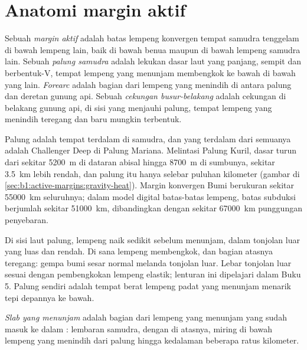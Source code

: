 \section{Anatomi margin aktif}\label{sec:b1:active-margins:anatomy}

\begin{definition}\label{def:b1:active-margins:active-margin}
Sebuah \emph{margin aktif} adalah batas lempeng konvergen tempat  samudra tenggelam di bawah lempeng lain, baik di bawah benua maupun di bawah lempeng samudra lain. Sebuah \emph{palung samudra} adalah lekukan dasar laut yang panjang, sempit dan berbentuk-V, tempat lempeng yang menunjam membengkok ke bawah di bawah yang lain. \emph{Forearc} adalah bagian dari lempeng yang menindih di antara palung dan deretan gunung api. Sebuah \emph{cekungan busur-belakang} adalah cekungan di belakang gunung api, di sisi yang menjauhi palung, tempat lempeng yang menindih teregang dan  baru mungkin terbentuk.
\end{definition}

Palung adalah tempat terdalam di samudra, dan yang terdalam dari semuanya adalah Challenger Deep di Palung Mariana. Melintasi Palung Kuril, dasar turun dari sekitar \qty{5200}{m} di dataran abisal hingga \qty{8700}{m} di sumbunya, sekitar \qty{3.5}{km} lebih rendah, dan palung itu hanya selebar puluhan kilometer (gambar di \cref{sec:b1:active-margins:gravity-heat}). Margin konvergen Bumi berukuran sekitar \qty{55000}{km} seluruhnya; dalam model digital batas-batas lempeng, batas subduksi berjumlah sekitar \qty{51000}{km}, dibandingkan dengan sekitar \qty{67000}{km} punggungan penyebaran.

Di sisi laut palung, lempeng naik sedikit sebelum menunjam, dalam tonjolan luar yang luas dan rendah. Di sana lempeng membengkok, dan bagian atasnya teregang: gempa bumi sesar normal melanda tonjolan luar. Lebar tonjolan luar sesuai dengan pembengkokan lempeng elastik; lenturan  ini dipelajari dalam Buku 5. Palung sendiri adalah tempat berat lempeng padat yang menunjam menarik tepi depannya ke bawah.

\begin{definition}\label{def:b1:active-margins:slab}
\emph{Slab yang menunjam} adalah bagian dari lempeng yang menunjam yang sudah masuk ke dalam : lembaran  samudra, dengan  di atasnya, miring di bawah lempeng yang menindih dari palung hingga kedalaman beberapa ratus kilometer.
\end{definition}

